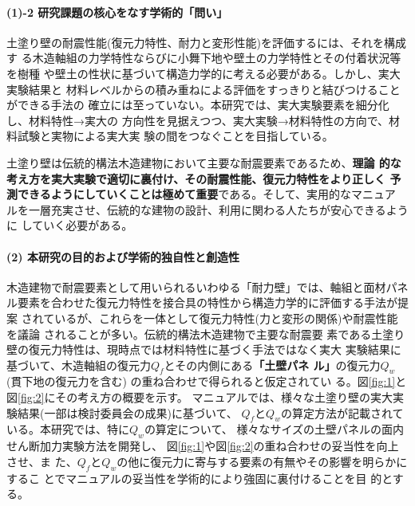 \documentclass[11pt,a4paper,uplatex,dvipdfmx]{ujarticle} 		%
\newcommand{\研究課題名}{伝統的な木造土塗り壁の復元力に及ぼす軸組の影響に関する実験研究}
\newcommand{\研究機関名}{公立鳥取環境大学}
\newcommand{\研究代表者氏名}{中治弘行}
\newcommand{\私}{{\研究代表者氏名}}
\newcommand{\研究期間の最終元号年度}{8}  %
\begin{document}
\paragraph{(1)-2 研究課題の核心をなす学術的「問い」}
\mbox{}\par

土塗り壁の耐震性能(復元力特性、耐力と変形性能)を評価するには、それを構成す
る木造軸組の力学特性ならびに小舞下地や壁土の力学特性とその付着状況等を樹種
や壁土の性状に基づいて構造力学的に考える必要がある。しかし、実大実験結果と
材料レベルからの積み重ねによる評価をすっきりと結びつけることができる手法の
確立には至っていない。本研究では、実大実験要素を細分化し、材料特性→実大の
方向性を見据えつつ、実大実験→材料特性の方向で、材料試験と実物による実大実
験の間をつなぐことを目指している。

土塗り壁は伝統的構法木造建物において主要な耐震要素であるため、\textbf{理論
  的な考え方を実大実験で適切に裏付け、その耐震性能、復元力特性をより正しく
  予測できるようにしていくことは極めて重要}である。そして、実用的なマニュア
ルを一層充実させ、伝統的な建物の設計、利用に関わる人たちが安心できるように
していく必要がある。

\paragraph{(2) 本研究の目的および学術的独自性と創造性}
\mbox{}\par

木造建物で耐震要素として用いられるいわゆる{「耐力壁」}では、軸組と面材パネ
ル要素を合わせた復元力特性を接合具の特性から構造力学的に評価する手法が提案
されているが、これらを一体として復元力特性(力と変形の関係)や耐震性能を議論
されることが多い\cite{kyoyououryoku2017}。伝統的構法木造建物で主要な耐震要
素である土塗り壁の復元力特性は、現時点では材料特性に基づく手法ではなく実大
実験結果に基づいて、木造軸組の復元力$Q_f$とその内側にある\textbf{「土壁パネ
  ル」}の復元力$Q_w$ (貫下地の復元力を含む) の重ね合わせで得られると仮定されてい
る。図\ref{fig:1}と図\ref{fig:2}にその考え方の概要を示す。
マニュアル\cite{manual2019}では、様々な土塗り壁の実大実験結果(一部は検討委員会の成果)に基づいて、
$Q_f$と$Q_w$の算定方法が記載されている。本研究では、特に$Q_w$の算定について、
様々なサイズの土壁パネルの面内せん断加力実験方法を開発し、
図\ref{fig:1}や図\ref{fig:2}の重ね合わせの妥当性を向上させ、ま
た、$Q_f$と$Q_w$の他に復元力に寄与する要素の有無やその影響を明らかにするこ
とでマニュアル\cite{manual2019}の妥当性を学術的により強固に裏付けることを目
的とする。
\end{document}
